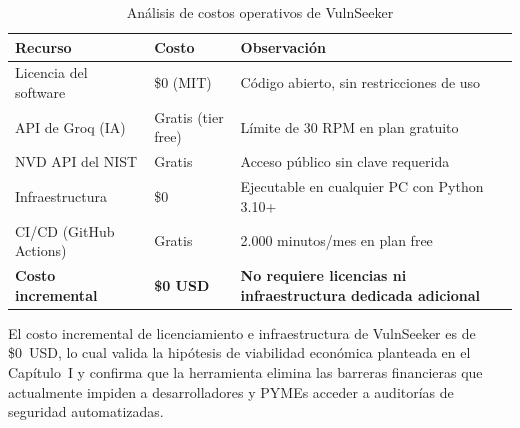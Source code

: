 \documentclass[12pt, a4paper]{article}
\begin{document}
\begin{table}[H]
    \centering
    \caption{Análisis de costos operativos de VulnSeeker}
    \label{tab:costos}
    \begin{tabular}{p{4cm} p{3cm} p{5cm}}
        \toprule
        \textbf{Recurso} & \textbf{Costo} & \textbf{Observación} \\
        \midrule
        Licencia del software &
            \$0 (MIT) &
            Código abierto, sin restricciones de uso \\
        API de Groq (IA) &
            Gratis (tier free) &
            Límite de 30 RPM en plan gratuito \\
        NVD API del NIST &
            Gratis &
            Acceso público sin clave requerida \\
        Infraestructura &
            \$0 &
            Ejecutable en cualquier PC con Python 3.10+ \\
        CI/CD (GitHub Actions) &
            Gratis &
            2.000 minutos/mes en plan free \\
        \midrule
        \textbf{Costo incremental} &
            \textbf{\$0 USD} &
            \textbf{No requiere licencias ni infraestructura dedicada adicional} \\
        \midrule
    \end{tabular}
\end{table}

El costo incremental de licenciamiento e infraestructura de VulnSeeker es de \$0~USD, lo cual valida la
hipótesis de viabilidad económica planteada en el Capítulo~I y confirma que
la herramienta elimina las barreras financieras que actualmente impiden a
desarrolladores y PYMEs acceder a auditorías de seguridad automatizadas.

\newpage
\printbibliography[title=Referencias Bibliográficas]
\end{document}
